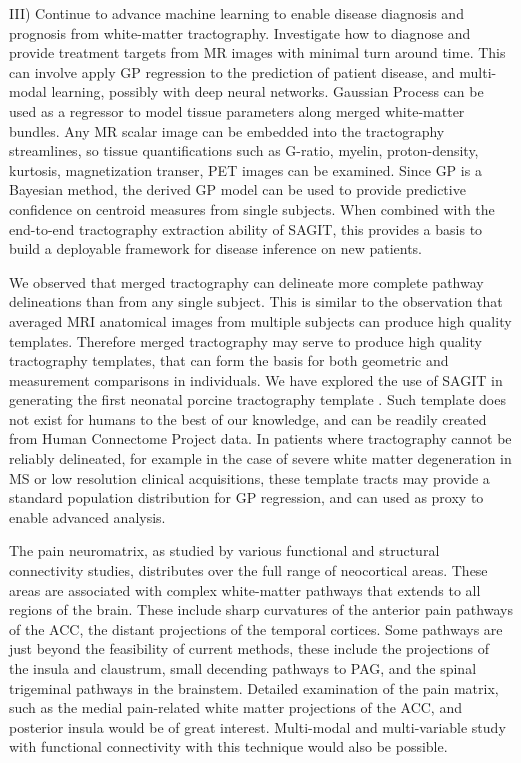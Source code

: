 III) Continue to advance machine learning to enable disease diagnosis and prognosis from white-matter tractography. Investigate how to diagnose and provide treatment targets from MR images with minimal turn around time. This can involve apply GP regression to the prediction of patient disease, and multi-modal learning, possibly with deep neural networks. Gaussian Process can be used as a regressor to model tissue parameters along merged white-matter bundles. Any MR scalar image can be embedded into the tractography streamlines, so tissue quantifications such as G-ratio, myelin, proton-density, kurtosis, magnetization transer, PET images can be examined. Since GP is a Bayesian method, the derived GP model can be used to provide predictive confidence on centroid measures from single subjects. When combined with the end-to-end tractography extraction ability of SAGIT, this provides a basis to build a deployable framework for disease inference on new patients. 


We observed that merged tractography can delineate more complete pathway delineations than from any single subject. This is similar to the observation that averaged MRI anatomical images from multiple subjects can produce high quality templates. Therefore merged tractography may serve to produce high quality tractography templates, that can form the basis for both geometric and measurement comparisons in individuals. We have explored the use of SAGIT in generating the first neonatal porcine tractography template \cite{Zhong2016a}. Such template does not exist for humans to the best of our knowledge, and can be readily created from Human Connectome Project data. In patients where tractography cannot be reliably delineated, for example in the case of severe white matter degeneration in MS or low resolution clinical acquisitions, these template tracts may provide a standard population distribution for GP regression, and can used as proxy to enable advanced analysis.

The pain neuromatrix, as studied by various functional and structural connectivity studies, distributes over the full range of neocortical areas. These areas are associated with complex white-matter pathways that extends to all regions of the brain. These include sharp curvatures of the anterior pain pathways of the ACC, the distant projections of the temporal cortices. Some pathways are just beyond the feasibility of current methods, these include the projections of the insula and claustrum, small decending pathways to PAG, and the spinal trigeminal pathways in the brainstem. Detailed examination of the pain matrix, such as the medial pain-related white matter projections of the ACC, and posterior insula would be of great interest. Multi-modal and multi-variable study with functional connectivity with this technique would also be possible. 

